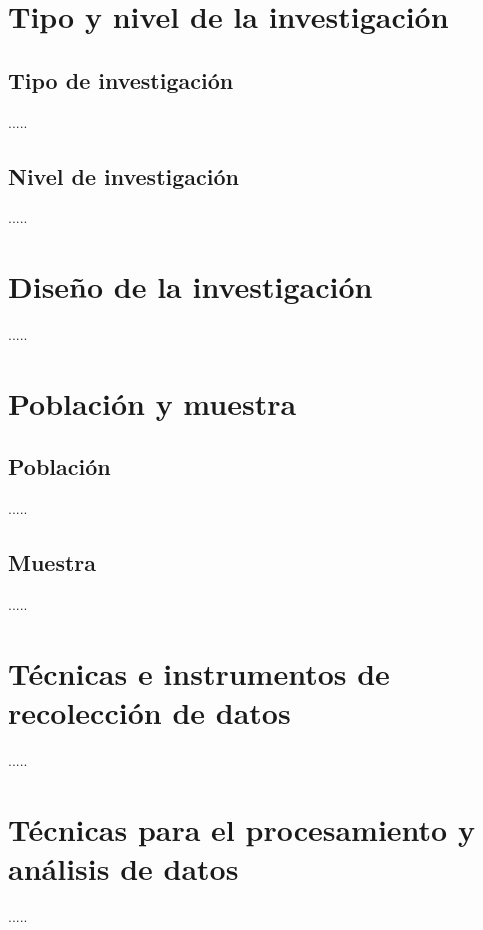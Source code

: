 
\section{Tipo y nivel de la investigación}
\subsection{Tipo de investigación} 
.....
\subsection{Nivel de investigación} 
.....

\section{Diseño de la investigación} 

.....


\section{Población y muestra} 

\subsection{Población} 
.....

\subsection{Muestra} 
.....

\section{Técnicas e instrumentos de recolección de datos} 

.....


\section{Técnicas para el procesamiento y análisis de datos} 

.....